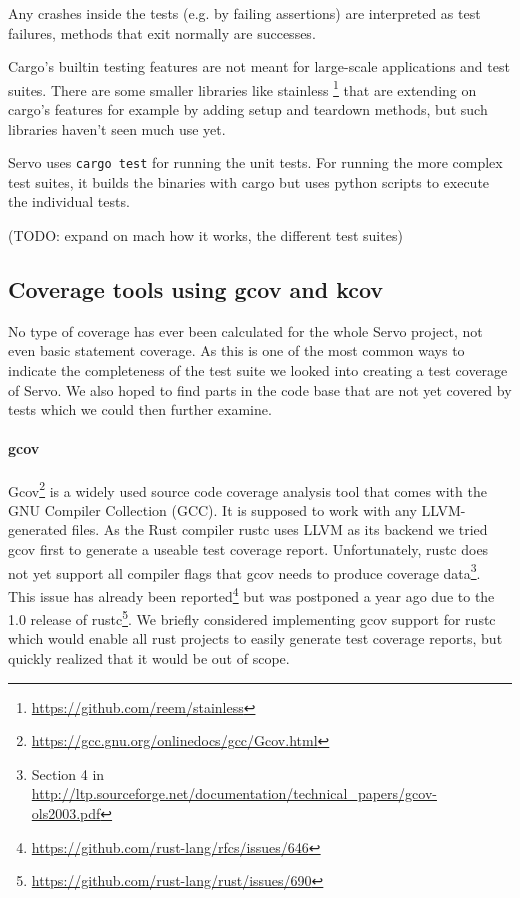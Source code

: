 \documentclass{scrartcl}
\newcommand{\todo}[1] {{\color{red}(TODO: #1)}}
\begin{document}
Any crashes inside the tests (e.g. by failing assertions) are interpreted as test failures, methods that exit normally are successes.

Cargo's builtin testing features are not meant for large-scale applications and test suites. There are some smaller libraries like stainless \footnote{\url{https://github.com/reem/stainless}} that are extending on cargo's features for example by adding setup and teardown methods, but such libraries haven't seen much use yet. 

Servo uses \texttt{cargo test} for running the unit tests. For running the more complex test suites, it builds the binaries with cargo but uses python scripts to execute the individual tests.

\todo{expand on mach how it works, the different test suites}


\subsection{Coverage tools using gcov and kcov}

No type of coverage has ever been calculated for the whole Servo project, not even basic statement coverage. As this is one of the most common ways to indicate the completeness of the test suite we looked into creating a test coverage of Servo. We also hoped to find parts in the code base that are not yet covered by tests which we could then further examine. 

\paragraph{gcov}
Gcov\footnote{\url{https://gcc.gnu.org/onlinedocs/gcc/Gcov.html}} is a widely used source code coverage analysis tool that comes with the GNU Compiler Collection (GCC). It is supposed to work with any LLVM-generated files. As the Rust compiler rustc uses LLVM as its backend we tried gcov first to generate a useable test coverage report. Unfortunately, rustc does not yet support all compiler flags that gcov needs to produce coverage data\footnote{Section 4 in \url{http://ltp.sourceforge.net/documentation/technical_papers/gcov-ols2003.pdf}}. This issue has already been reported\footnote{\url{https://github.com/rust-lang/rfcs/issues/646}} but was postponed a year ago due to the 1.0 release of rustc\footnote{\url{https://github.com/rust-lang/rust/issues/690}}. We briefly considered implementing gcov support for rustc which would enable all rust projects to easily generate test coverage reports, but quickly realized that it would be out of scope.
\end{document}

